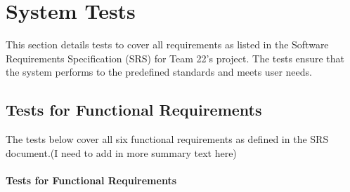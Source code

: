 \documentclass[12pt, titlepage]{article}
\begin{document}
\section{System Tests}

This section details tests to cover all requirements as listed in the
Software Requirements Specification (SRS) for Team 22's project. The
tests ensure that the system performs to the predefined standards and
meets user needs.

\subsection{Tests for Functional Requirements}

The tests below cover all six functional requirements as defined in
the SRS document.(I need to add in more summary text here)

\paragraph{Tests for Functional Requirements}
\end{document}
